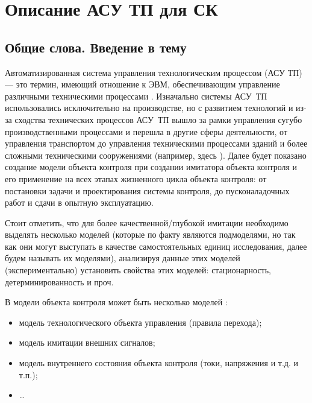 \chapter{Описание АСУ ТП для СК}\label{ch:chn}

\section{Общие слова. Введение в тему}


Автоматизированная система управления технологическим процессом (АСУ ТП) --- это термин,
имеющий отношение к ЭВМ, обеспечивающим управление различными техническими процессами \cite{journal:iter_research_guriev_2016}.
Изначально системы АСУ~ТП использовались исключительно на производстве, но с развитием технологий
и из-за сходства технических процессов АСУ~ТП вышло за рамки управления сугубо производственными процессами
и перешла в другие сферы деятельности, от управления транспортом %
до управления техническими процессами зданий \cite{journal:vechisl_tech:2013:Golushko}
и более сложными техническими сооружениями (например, здесь \cite{journal:vechisl_tech:2004_okolnischnikov}).
%
Далее будет показано создание  модели объекта контроля
при создании имитатора объекта контроля и его применение на всех этапах жизненного цикла
объекта контроля: от постановки задачи и проектирования системы контроля, до пусконаладочных работ
и сдачи в опытную эксплуатацию.


Стоит отметить, что для более качественной/глубокой имитации необходимо выделять несколько моделей
(которые по факту являются подмоделями, но так как они могут выступать в качестве самостоятельных единиц исследования,
далее будем называть их моделями),
анализируя данные этих моделей (экспериментально) установить свойства этих моделей:
стационарность, детерминированность и проч.

В модели объекта контроля может быть несколько моделей \cite{journal:vechisl_tech:2004_okolnischnikov}:
\begin{itemize}
    \item модель технологического объекта управления (правила перехода);
    \item модель имитации внешних сигналов;
    \item модель внутреннего состояния объекта контроля (токи, напряжения и т.д. и т.п.);
    \item \ldots
\end{itemize}

